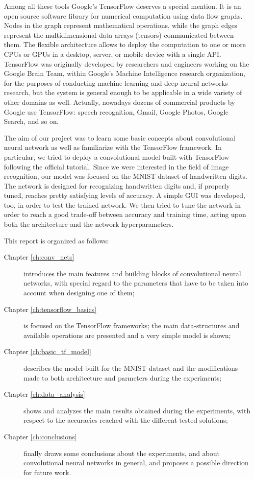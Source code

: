 Among all these tools Google's TensorFlow deserves a special mention.  It is an open source software library for numerical computation using data flow graphs. Nodes in the graph represent mathematical operations, while the graph edges represent the multidimensional data arrays (tensors) communicated between them. The flexible architecture allows to deploy the computation to one or more \acsp{CPU} or \acsp{GPU} in a desktop, server, or mobile device with a single API. TensorFlow was originally developed by researchers and engineers working on the Google Brain Team, within Google's Machine Intelligence research organization, for the purposes of conducting machine learning and deep neural networks research, but the system is general enough to be applicable in a wide variety of other domains as well. Actually, nowadays dozens of commercial products by Google use TensorFlow: speech recognition, Gmail, Google Photos, Google Search, and so on.

The aim of our project was to learn some basic concepts about convolutional neural network as well as familiarize with the TensorFlow framework. In particular, we tried to deploy a convolutional model built with TensorFlow following the official tutorial. Since we were interested in the field of image recognition, our model was focused on the MNIST dataset of handwritten digits. The network is designed for recognizing handwritten digits and, if properly tuned, reaches pretty satisfying levels of accuracy. A simple \ac{GUI} was developed, too, in order to test the trained network. We then tried to tune the network in order to reach a good trade-off between accuracy and training time, acting upon both the architecture and the network hyperparameters.

This report is organized as follows:

\begin{description}
	
	\item[Chapter \ref{ch:conv_nets}] introduces the main features and building blocks of convolutional neural networks, with special regard to the parameters that have to be taken into account when designing one of them;
	
	\item[Chapter \ref{ch:tensorflow_basics}] is focused on the TensorFlow frameworks; the main data-structures and available operations are presented and a very simple model is shown;
	
	\item[Chapter \ref{ch:basic_tf_model}] describes the model built for the MNIST dataset and the modifications made to both architecture and parmeters during the experiments;
	
	\item[Chapter \ref{ch:data_analysis}] shows and analyzes the main results obtained during the experiments, with respect to the accuracies reached with the different tested solutions;
	
	\item[Chapter \ref{ch:conclusions}] finally draws some conclusions about the experiments, and about convolutional neural networks in general, and proposes a possible direction for future work.
	
\end{description}